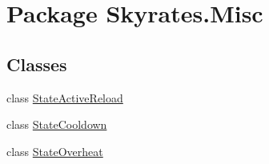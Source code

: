 \hypertarget{namespace_skyrates_1_1_misc}{\section{Package Skyrates.\-Misc}
\label{namespace_skyrates_1_1_misc}
}
\subsection*{Classes}
\begin{DoxyCompactItemize}
\item 
class \hyperlink{class_skyrates_1_1_misc_1_1_state_active_reload}{State\-Active\-Reload}
\item 
class \hyperlink{class_skyrates_1_1_misc_1_1_state_cooldown}{State\-Cooldown}
\item 
class \hyperlink{class_skyrates_1_1_misc_1_1_state_overheat}{State\-Overheat}
\end{DoxyCompactItemize}
